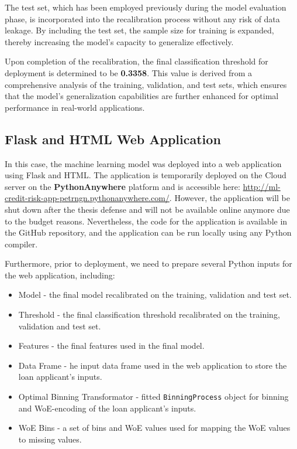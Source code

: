 The test set, which has been employed previously during the model evaluation phase, is incorporated into the recalibration process without any risk of data leakage.
By including the test set, the sample size for training is expanded, thereby increasing the model's capacity to generalize effectively.

Upon completion of the recalibration, the final classification threshold for deployment is determined to be \textbf{0.3358}.
This value is derived from a comprehensive analysis of the training, validation, and test sets, which ensures that the model's generalization capabilities are further enhanced for optimal performance in real-world applications.

\subsection{Flask and HTML Web Application}

In this case, the machine learning model was deployed into a web application using Flask and HTML. The application is temporarily deployed on the Cloud server on the \textbf{PythonAnywhere} platform and is accessible here: \url{http://ml-credit-risk-app-petrngn.pythonanywhere.com/}.
However, the application will be shut down after the thesis defense and will not be available online anymore due to the budget reasons.
Nevertheless, the code for the application is available in the GitHub repository, and the application can be run locally using any Python compiler.

Furthermore, prior to deployment, we need to prepare several Python inputs for the web application, including:
\begin{itemize}\setlength\itemsep{0em}
\item Model - the final model recalibrated on the training, validation and test set.
\item Threshold - the final classification threshold recalibrated on the training, validation and test set.
\item Features - the final features used in the final model.
\item Data Frame - he input data frame used in the web application to store the loan applicant's inputs.
\item Optimal Binning Transformator - fitted \lstinline{BinningProcess} object for binning and WoE-encoding of the loan applicant's inputs.
\item WoE Bins - a set of bins and WoE values used for mapping the WoE values to missing values.
\end{itemize}

